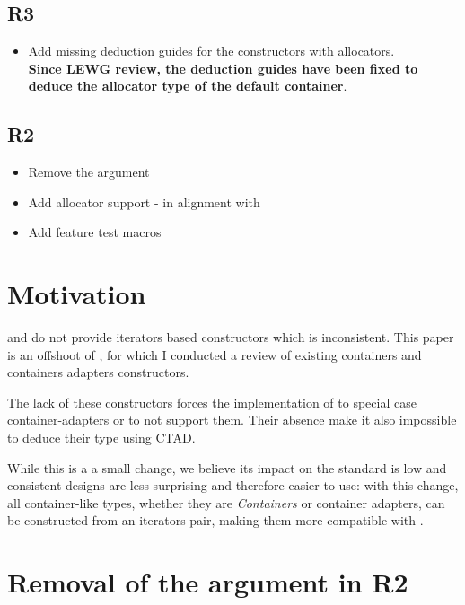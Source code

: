 \documentclass{wg21}
\begin{document}
\subsection{R3}
\begin{itemize}
    \item Add missing deduction guides for the constructors with allocators.\\
    \textbf{Since LEWG review, the deduction guides have been fixed to deduce the allocator type of the default container}.
    
\end{itemize}
\textbf{}
\subsection{R2}
\begin{itemize}
    \item Remove the  argument
    \item Add allocator support - in alignment with 
    \item Add feature test macros
\end{itemize}


\section{Motivation}

 and  do not provide iterators based constructors which is inconsistent.
This paper is an offshoot of \cite{P1206}, for which I conducted a review of existing containers and containers adapters constructors.

The lack of these constructors forces the implementation of  to special case container-adapters or to not support them.
Their absence make it also impossible to deduce their type using CTAD.

While this is a a small change, we believe its impact on the standard is low and consistent designs are less surprising and therefore easier
to use: with this change, all container-like types, whether they are \emph{Containers} or container adapters, can be constructed from 
an iterators pair, making them more compatible with .


\section{Removal of the  argument in R2}
\end{document}
